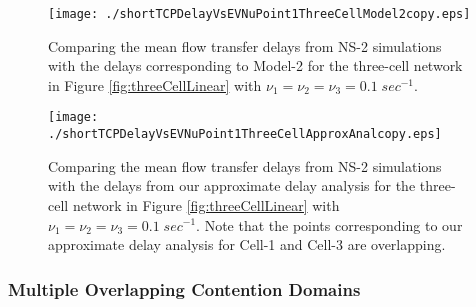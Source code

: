 \documentclass[10pt,a4paper,journal]{IEEEtran}
\theoremstyle{definition}
\theoremstyle{remark}
\theoremstyle{plain}
\begin{document}
\begin{figure}[tb]
  \centering
  \begin{minipage}{8.25cm}
    \begin{center}
      \texttt{[image: ./shortTCPDelayVsEVNuPoint1ThreeCellModel2copy.eps]}
     \caption{Comparing the mean flow transfer delays from
       NS-2 simulations with the delays corresponding to Model-2 for
       the three-cell network in Figure \ref{fig:threeCellLinear}
       with $\nu_1 = \nu_2 = \nu_3 = 0.1 \;
       sec^{-1}$. \label{fig:shortTCPDelayVsEVNuPoint1ThreeCellLinearModel2}}
     \vspace{2mm}
    \end{center}
  \end{minipage}
\begin{minipage}{8.25cm}
    \begin{center}
      \texttt{[image: ./shortTCPDelayVsEVNuPoint1ThreeCellApproxAnalcopy.eps]}
     \caption{Comparing the mean flow transfer delays from
       NS-2 simulations with the delays from our approximate delay
       analysis for the three-cell network in Figure
       \ref{fig:threeCellLinear} with $\nu_1 = \nu_2 = \nu_3 = 0.1
       \; sec^{-1}$. Note that the points corresponding to our
       approximate delay analysis for Cell-1 and Cell-3 are
       overlapping. \label{fig:shortTCPDelayVsEVNuPoint1ThreeCellLinearApproxAnal}}
    \end{center}
  \end{minipage}
\end{figure}



\subsubsection{Multiple Overlapping Contention Domains}
\label{subsubsec:multiple-contention-domain}
\end{document}
